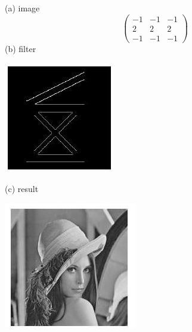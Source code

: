 \documentclass[10pt]{article}
\begin{document}
(a) image
$$
\left(\begin{array}{ccc}
-1 & -1 & -1 \\
2 & 2 & 2 \\
-1 & -1 & -1
\end{array}\right)
$$
(b) filter

\includegraphics[max width=\textwidth]{2022_01_06_b5ce182ed1bd5f482e5bg-09(1)}

(c) result

\includegraphics[max width=\textwidth]{2022_01_06_b5ce182ed1bd5f482e5bg-09(2)}
\end{document}
